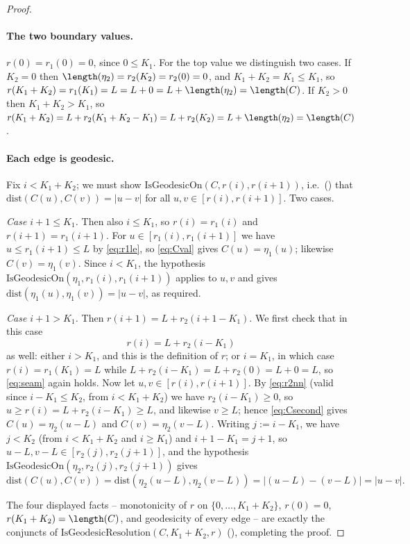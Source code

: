 \begin{proof}
  \paragraph{The two boundary values.} $r(0) = r_1(0) = 0$, since $0 \le K_1$. For the top value we
  distinguish two cases. If $K_2=0$ then $\length(\eta_2) = r_2(K_2) = r_2(0) = 0$, and $K_1+K_2 =
  K_1 \le K_1$, so $r(K_1+K_2) = r_1(K_1) = L = L + 0 = L + \length(\eta_2) = \length(C)$. If
  $K_2>0$ then $K_1+K_2 > K_1$, so $r(K_1+K_2) = L + r_2(K_1+K_2-K_1) = L + r_2(K_2) = L +
  \length(\eta_2) = \length(C)$.

  \paragraph{Each edge is geodesic.} Fix $i < K_1+K_2$; we must show
  $\mathrm{IsGeodesicOn}(C,r(i),r(i+1))$, i.e.\ () that
  $\mathrm{dist}(C(u),C(v)) = |u-v|$ for all $u,v \in [r(i),r(i+1)]$. Two cases.

  \emph{Case $i+1 \le K_1$.} Then also $i \le K_1$, so $r(i)=r_1(i)$ and $r(i+1)=r_1(i+1)$. For $u
  \in [r_1(i),r_1(i+1)]$ we have $u \le r_1(i+1) \le L$ by \eqref{eq:r1le}, so \eqref{eq:Cval}
  gives $C(u)=\eta_1(u)$; likewise $C(v)=\eta_1(v)$. Since $i<K_1$, the hypothesis
  $\mathrm{IsGeodesicOn}(\eta_1,r_1(i),r_1(i+1))$ applies to $u,v$ and gives
  $\mathrm{dist}(\eta_1(u),\eta_1(v)) = |u-v|$, as required.

  \emph{Case $i+1 > K_1$.} Then $r(i+1) = L + r_2(i+1-K_1)$. We first check that in this case
  \begin{equation}\label{eq:seam}
    r(i) = L + r_2(i-K_1)
  \end{equation}
  as well: either $i > K_1$, and this is the definition of $r$; or $i = K_1$, in which case $r(i) =
  r_1(K_1) = L$ while $L + r_2(i-K_1) = L + r_2(0) = L + 0 = L$, so \eqref{eq:seam} again holds.
  Now let $u,v \in [r(i),r(i+1)]$. By \eqref{eq:r2nn} (valid since $i-K_1 \le K_2$, from $i <
  K_1+K_2$) we have $r_2(i-K_1) \ge 0$, so $u \ge r(i) = L + r_2(i-K_1) \ge L$, and likewise $v \ge
  L$; hence \eqref{eq:Csecond} gives $C(u)=\eta_2(u-L)$ and $C(v)=\eta_2(v-L)$. Writing $j :=
  i-K_1$, we have $j < K_2$ (from $i < K_1+K_2$ and $i \ge K_1$) and $i+1-K_1 = j+1$, so $u-L,v-L
  \in [r_2(j),r_2(j+1)]$, and the hypothesis $\mathrm{IsGeodesicOn}(\eta_2,r_2(j),r_2(j+1))$ gives
  \[
    \mathrm{dist}(C(u),C(v)) = \mathrm{dist}(\eta_2(u-L),\eta_2(v-L)) = |(u-L)-(v-L)| = |u-v| .
  \]

  The four displayed facts -- monotonicity of $r$ on $\{0,\dots,K_1+K_2\}$, $r(0)=0$,
  $r(K_1+K_2)=\length(C)$, and geodesicity of every edge -- are exactly the conjuncts of
  $\mathrm{IsGeodesicResolution}(C,K_1+K_2,r)$ (), completing the
  proof.
\end{proof}
